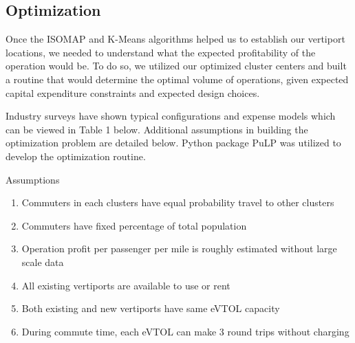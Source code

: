 \documentclass{article}
\begin{document}
\subsection{Optimization}

Once the ISOMAP and K-Means algorithms helped us to establish our vertiport locations, we needed to understand what the expected profitability of the operation would be. To do so, we utilized our optimized cluster centers and built a routine that would determine the optimal volume of operations, given expected capital expenditure constraints and expected design choices. 

Industry surveys have shown typical configurations and expense models which can be viewed in Table 1 below. Additional assumptions in building the optimization problem are detailed below. Python package PuLP was utilized to develop the optimization routine.

Assumptions
\begin{enumerate}
  \item Commuters in each clusters have equal probability travel to other clusters
  \item Commuters have fixed percentage of total population
  \item Operation profit per passenger per mile is roughly estimated without large scale data
  \item All existing vertiports are available to use or rent
  \item Both existing and new vertiports have same eVTOL capacity
  \item During commute time, each eVTOL can make 3 round trips without charging
\end{enumerate}
\end{document}
